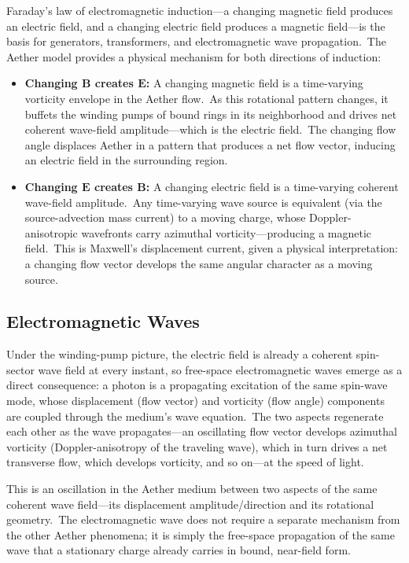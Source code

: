 ﻿\documentclass[12pt,letterpaper]{article}
\begin{document}
Faraday's law of electromagnetic induction---a changing magnetic field produces an
electric field, and a changing electric field produces a magnetic field---is the basis
for generators, transformers, and electromagnetic wave propagation.\ The Aether model
provides a physical mechanism for both directions of induction:

\begin{itemize}[leftmargin=2em]
  \item \textbf{Changing $\mathbf{B}$ creates $\mathbf{E}$:} A changing magnetic field is a
    time-varying vorticity envelope in the Aether flow.\ As this rotational pattern
    changes, it buffets the winding pumps of bound rings in its neighborhood and
    drives net coherent wave-field amplitude---which is the electric field.\ The
    changing flow angle displaces Aether in a pattern that produces a net flow vector,
    inducing an electric field in the surrounding region.

  \item \textbf{Changing $\mathbf{E}$ creates $\mathbf{B}$:} A changing electric field is a
    time-varying coherent wave-field amplitude.\ Any time-varying wave source is
    equivalent (via the source-advection mass current) to a moving charge, whose
    Doppler-anisotropic wavefronts carry azimuthal vorticity---producing a magnetic
    field.\ This is Maxwell's displacement current, given a physical interpretation:
    a changing flow vector develops the same angular character as a moving source.
\end{itemize}


\subsection{Electromagnetic Waves}

Under the winding-pump picture, the electric field is already a coherent
spin-sector wave field at every instant, so free-space electromagnetic waves emerge as a
direct consequence: a photon is a propagating excitation of the same spin-wave
mode, whose displacement (flow vector) and vorticity (flow angle) components are
coupled through the medium's wave equation.\ The two aspects regenerate each other as
the wave propagates---an oscillating flow vector develops azimuthal vorticity
(Doppler-anisotropy of the traveling wave), which in turn drives a net transverse
flow, which develops vorticity, and so on---at the speed of light.

This is an oscillation in the Aether medium between two aspects of the same coherent
wave field---its displacement amplitude/direction and its rotational geometry.\ The
electromagnetic wave does not require a separate mechanism from the other Aether
phenomena; it is simply the free-space propagation of the same wave that a stationary
charge already carries in bound, near-field form.
\end{document}
